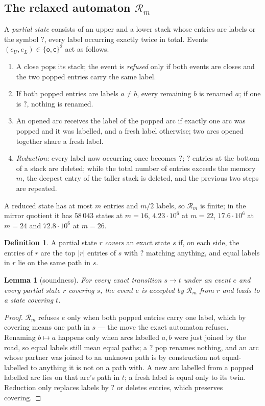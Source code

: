 \documentclass[11pt]{amsart}
\newtheorem{lemma}[theorem]{Lemma}
\theoremstyle{definition}
\newtheorem{definition}[theorem]{Definition}
\newcommand{\Rel}{\mathcal R}
\newcommand{\op}{\mathsf{o}}
\newcommand{\cl}{\mathsf{c}}
\newcommand{\qq}{\mathord{?}}
\begin{document}
\subsection{The relaxed automaton $\Rel_m$}
A \emph{partial state} consists of an upper and a lower stack whose entries are labels or the symbol $\qq$, every label occurring exactly twice in total. Events $(e_U,e_L)\in\{\op,\cl\}^2$ act as follows.
\begin{enumerate}[nosep]
\item A close pops its stack; the event is \emph{refused} only if both events are closes and the two popped entries carry the same label.
\item If both popped entries are labels $a\ne b$, every remaining $b$ is renamed $a$; if one is $\qq$, nothing is renamed.
\item An opened arc receives the label of the popped arc if exactly one arc was popped and it was labelled, and a fresh label otherwise; two arcs opened together share a fresh label.
\item \emph{Reduction:} every label now occurring once becomes $\qq$; $\qq$ entries at the bottom of a stack are deleted; while the total number of entries exceeds the memory $m$, the deepest entry of the taller stack is deleted, and the previous two steps are repeated.
\end{enumerate}
A reduced state has at most $m$ entries and $m/2$ labels, so $\Rel_m$ is finite; in the mirror quotient it has $58\,043$ states at $m=16$, $4.23\cdot10^6$ at $m=22$, $17.6\cdot10^6$ at $m=24$ and $72.8\cdot10^6$ at $m=26$.

\begin{definition}
A partial state $r$ \emph{covers} an exact state $s$ if, on each side, the entries of $r$ are the top $|r|$ entries of $s$ with $\qq$ matching anything, and equal labels in $r$ lie on the same path in $s$.
\end{definition}

\begin{lemma}[soundness]\label{lem:sound}
For every exact transition $s\to t$ under an event $e$ and every partial state $r$ covering $s$, the event $e$ is accepted by $\Rel_m$ from $r$ and leads to a state covering $t$.
\end{lemma}

\begin{proof}
$\Rel_m$ refuses $e$ only when both popped entries carry one label, which by covering means one path in $s$ --- the move the exact automaton refuses. Renaming $b\mapsto a$ happens only when arcs labelled $a,b$ were just joined by the road, so equal labels still mean equal paths; a $\qq$ pop renames nothing, and an arc whose partner was joined to an unknown path is by construction not equal-labelled to anything it is not on a path with. A new arc labelled from a popped labelled arc lies on that arc's path in $t$; a fresh label is equal only to its twin. Reduction only replaces labels by $\qq$ or deletes entries, which preserves covering.
\end{proof}
\end{document}
